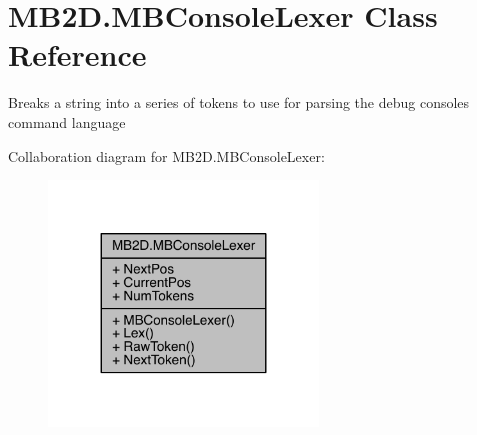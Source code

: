 \hypertarget{class_m_b2_d_1_1_m_b_console_lexer}{}\section{M\+B2\+D.\+M\+B\+Console\+Lexer Class Reference}
\label{class_m_b2_d_1_1_m_b_console_lexer}


Breaks a string into a series of tokens to use for parsing the debug consoles command language  




Collaboration diagram for M\+B2\+D.\+M\+B\+Console\+Lexer\+:\nopagebreak
\begin{figure}[H]
\begin{center}
\leavevmode
\includegraphics[width=203pt]{class_m_b2_d_1_1_m_b_console_lexer__coll__graph}
\end{center}
\end{figure}
